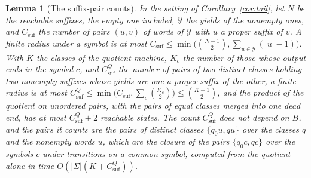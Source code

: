\documentclass[11pt,a4paper]{article}
\theoremstyle{definition}
\theoremstyle{plain}
\newtheorem{lemma}{Lemma}
\begin{document}
\begin{lemma}[The suffix-pair counts]\label{lem:tailcounts}
In the setting of Corollary~\ref{cor:tail}, let \(N\) be the reachable suffixes, the empty one included, \(\mathcal{Y}\)
the yields of the nonempty ones, and \(C_{\mathrm{suf}}\) the number of pairs \((u, v)\) of words of \(\mathcal{Y}\)
with \(u\) a proper suffix of \(v\). A finite radius under a symbol is at most
\(C_{\mathrm{suf}} \le \min\bigl(\binom{N - 1}{2}, \sum_{u \in \mathcal{Y}} (|u| - 1)\bigr)\). With \(K\) the classes of
the quotient machine, \(K_c\) the number of those whose output ends in the symbol \(c\), and \(C^{Q}_{\mathrm{suf}}\)
the number of pairs of two distinct classes holding two nonempty suffixes whose yields are one a proper suffix of the
other, a finite radius is at most
\(C^{Q}_{\mathrm{suf}} \le \min\bigl(C_{\mathrm{suf}}, \sum_c \binom{K_c}{2}\bigr) \le \binom{K - 1}{2}\), and the
product of the quotient on unordered pairs, with the pairs of equal classes merged into one dead end, has at most
\(C^{Q}_{\mathrm{suf}} + 2\) reachable states. The count \(C^{Q}_{\mathrm{suf}}\) does not depend on \(B\), and the
pairs it counts are the pairs of distinct classes \(\{q_0 u, qu\}\) over the classes \(q\) and the nonempty words \(u\),
which are the closure of the pairs \(\{q_0 c, qc\}\) over the symbols \(c\) under transitions on a common symbol,
computed from the quotient alone in time \(O(|\Sigma|(K + C^{Q}_{\mathrm{suf}}))\).
\end{lemma}
\end{document}
